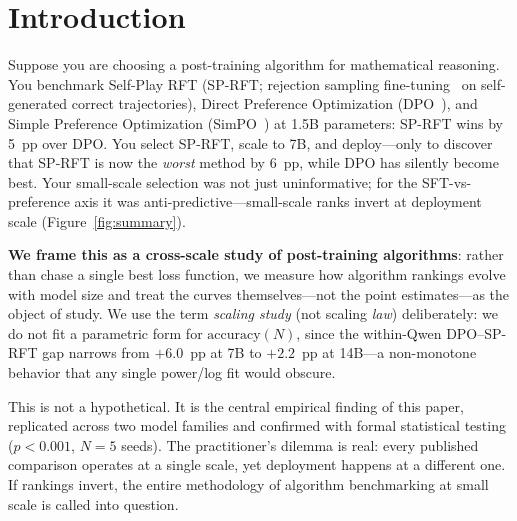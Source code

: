 \documentclass{article}
\newcommand{\sprft}{SP-RFT}
\begin{document}
\section{Introduction}

Suppose you are choosing a post-training algorithm for mathematical reasoning. You benchmark Self-Play RFT (\sprft{}; rejection sampling fine-tuning~\citep{yuan2023rft} on self-generated correct trajectories), Direct Preference Optimization (DPO~\citep{rafailov2023direct}), and Simple Preference Optimization (SimPO~\citep{meng2024simpo}) at 1.5B parameters: \sprft{} wins by 5~pp over DPO. You select \sprft{}, scale to 7B, and deploy---only to discover that \sprft{} is now the \emph{worst} method by 6~pp, while DPO has silently become best. Your small-scale selection was not just uninformative; for the SFT-vs-preference axis it was anti-predictive---small-scale ranks invert at deployment scale (Figure~\ref{fig:summary}).

\textbf{We frame this as a cross-scale study of post-training algorithms}: rather than chase a single best loss function, we measure how algorithm rankings evolve with model size and treat the curves themselves---not the point estimates---as the object of study. We use the term \emph{scaling study} (not scaling \emph{law}) deliberately: we do not fit a parametric form for $\mathrm{accuracy}(N)$, since the within-Qwen DPO--\sprft{} gap narrows from $+6.0$~pp at 7B to $+2.2$~pp at 14B---a non-monotone behavior that any single power/log fit would obscure.

This is not a hypothetical. It is the central empirical finding of this paper, replicated across two model families and confirmed with formal statistical testing ($p < 0.001$, $N{=}5$ seeds). The practitioner's dilemma is real: every published comparison operates at a single scale, yet deployment happens at a different one. If rankings invert, the entire methodology of algorithm benchmarking at small scale is called into question.
\end{document}
